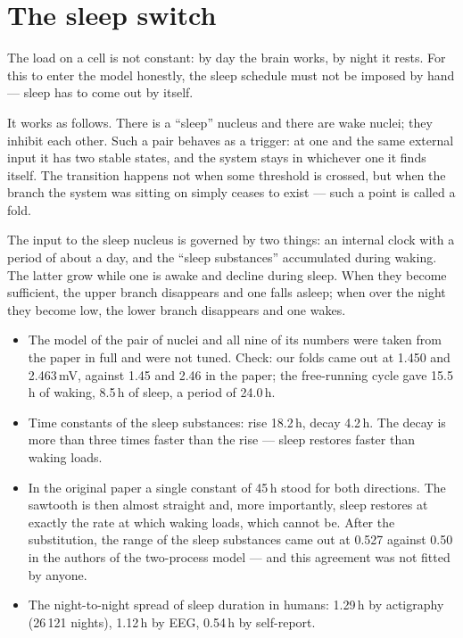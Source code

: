 \section{The sleep switch}\label{sec:sleep}

The load on a cell is not constant: by day the brain works, by night it rests. For this to enter the model honestly, the sleep schedule must not be imposed by hand --- sleep has to come out by itself.

It works as follows. There is a ``sleep'' nucleus and there are wake nuclei; they inhibit each other. Such a pair behaves as a trigger: at one and the same external input it has two stable states, and the system stays in whichever one it finds itself. The transition happens not when some threshold is crossed, but when the branch the system was sitting on simply ceases to exist --- such a point is called a fold.

The input to the sleep nucleus is governed by two things: an internal clock with a period of about a day, and the ``sleep substances'' accumulated during waking. The latter grow while one is awake and decline during sleep. When they become sufficient, the upper branch disappears and one falls asleep; when over the night they become low, the lower branch disappears and one wakes.

\facts
\begin{itemize}
\item The model of the pair of nuclei and all nine of its numbers were taken from the paper in full and were not tuned. Check: our folds came out at 1.450 and 2.463\,mV, against 1.45 and 2.46 in the paper; the free-running cycle gave 15.5\,h of waking, 8.5\,h of sleep, a period of 24.0\,h.\tS
\item Time constants of the sleep substances: rise 18.2\,h, decay 4.2\,h. The decay is more than three times faster than the rise --- sleep restores faster than waking loads.\tS
\item In the original paper a single constant of 45\,h stood for both directions. The sawtooth is then almost straight and, more importantly, sleep restores at exactly the rate at which waking loads, which cannot be. After the substitution, the range of the sleep substances came out at 0.527 against 0.50 in the authors of the two-process model --- and this agreement was not fitted by anyone.\tD
\item The night-to-night spread of sleep duration in humans: 1.29\,h by actigraphy (26\,121 nights), 1.12\,h by EEG, 0.54\,h by self-report.\tP
\end{itemize}

